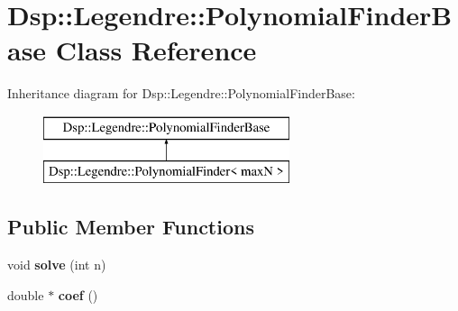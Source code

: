\hypertarget{classDsp_1_1Legendre_1_1PolynomialFinderBase}{\section{Dsp\-:\-:Legendre\-:\-:Polynomial\-Finder\-Base Class Reference}
\label{classDsp_1_1Legendre_1_1PolynomialFinderBase}
}
Inheritance diagram for Dsp\-:\-:Legendre\-:\-:Polynomial\-Finder\-Base\-:\begin{figure}[H]
\begin{center}
\leavevmode
\includegraphics[height=2.000000cm]{classDsp_1_1Legendre_1_1PolynomialFinderBase}
\end{center}
\end{figure}
\subsection*{Public Member Functions}
\begin{DoxyCompactItemize}
\item 
\hypertarget{classDsp_1_1Legendre_1_1PolynomialFinderBase_a51f9b7d32f3b7bfb6f591ebccc871941}{void {\bfseries solve} (int n)}\label{classDsp_1_1Legendre_1_1PolynomialFinderBase_a51f9b7d32f3b7bfb6f591ebccc871941}

\item 
\hypertarget{classDsp_1_1Legendre_1_1PolynomialFinderBase_a8b24211f1f2e26f0dca43d7de9b2aa19}{double $\ast$ {\bfseries coef} ()}\label{classDsp_1_1Legendre_1_1PolynomialFinderBase_a8b24211f1f2e26f0dca43d7de9b2aa19}

\end{DoxyCompactItemize}
